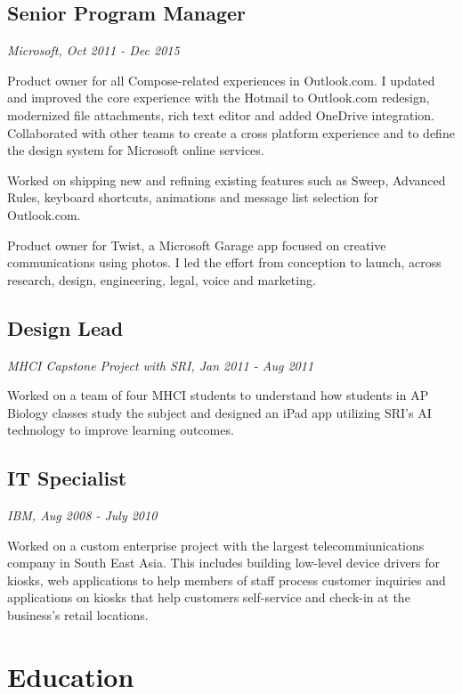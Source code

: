 \subsection[senior-program-manager]{Senior Program Manager}

{\em Microsoft, Oct 2011 - Dec 2015}

Product owner for all Compose-related experiences in Outlook.com. I
updated and improved the core experience with the Hotmail to Outlook.com
redesign, modernized file attachments, rich text editor and added
OneDrive integration. Collaborated with other teams to create a cross
platform experience and to define the design system for Microsoft online
services.

Worked on shipping new and refining existing features such as Sweep,
Advanced Rules, keyboard shortcuts, animations and message list
selection for Outlook.com.

Product owner for Twist, a Microsoft Garage app focused on creative
communications using photos. I led the effort from conception to launch,
across research, design, engineering, legal, voice and marketing.

\subsection[design-lead]{Design Lead}

{\em MHCI Capstone Project with SRI, Jan 2011 - Aug 2011}

Worked on a team of four MHCI students to understand how students in AP
Biology classes study the subject and designed an iPad app utilizing
SRI's AI technology to improve learning outcomes.

\subsection[it-specialist]{IT Specialist}

{\em IBM, Aug 2008 - July 2010}

Worked on a custom enterprise project with the largest
telecommiunications company in South East Asia. This includes building
low-level device drivers for kiosks, web applications to help members of
staff process customer inquiries and applications on kiosks that help
customers self-service and check-in at the business's retail locations.

\section[education]{Education}

